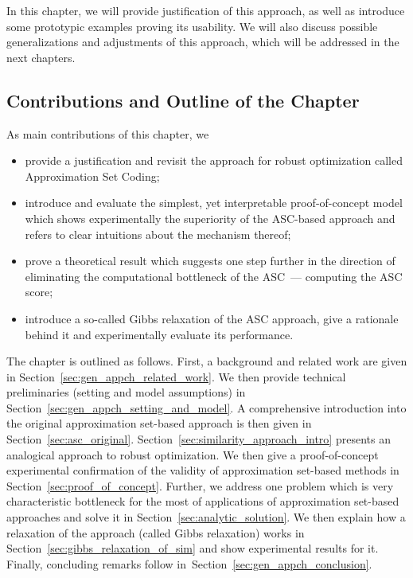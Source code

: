 In this chapter, we will provide justification of this approach, as well as
introduce some prototypic examples proving its usability. We will also discuss
possible generalizations and adjustments of this approach, which will be
addressed in the next chapters.

\subsection{Contributions and Outline of the Chapter}
\label{sec:asc_contribs}

As main contributions of this chapter, we
\begin{itemize}
  \item provide a justification and revisit the approach for robust optimization
    called Approximation Set Coding; 
  \item introduce and evaluate the simplest, yet interpretable proof-of-concept
    model which shows experimentally the superiority of the ASC-based approach
    and refers to clear intuitions about the mechanism thereof;
  \item prove a theoretical result which suggests one step further in the direction
    of eliminating the computational bottleneck of the ASC~--- computing the ASC
    score;
  \item introduce a so-called Gibbs relaxation of the ASC approach, give 
    a rationale behind it and experimentally evaluate its performance.
\end{itemize}

The chapter is outlined as follows. First, a background and related work are
given in Section~\ref{sec:gen_appch_related_work}. We then provide technical
preliminaries (setting and model assumptions) in
Section~\ref{sec:gen_appch_setting_and_model}. A comprehensive introduction into
the original approximation set-based approach is then given in
Section~\ref{sec:asc_original}. Section~\ref{sec:similarity_approach_intro}
presents an analogical approach to robust optimization. We then give a
proof-of-concept experimental confirmation of the validity of approximation
set-based methods in Section~\ref{sec:proof_of_concept}. Further, we address one
problem which is very characteristic bottleneck for the most of applications of
approximation set-based approaches and solve it in
Section~\ref{sec:analytic_solution}. We then explain how a relaxation of the
approach (called Gibbs relaxation) works in Section~\ref{sec:gibbs_relaxation_of_sim}
and show experimental results for it. Finally, concluding remarks follow
in~Section~\ref{sec:gen_appch_conclusion}.

